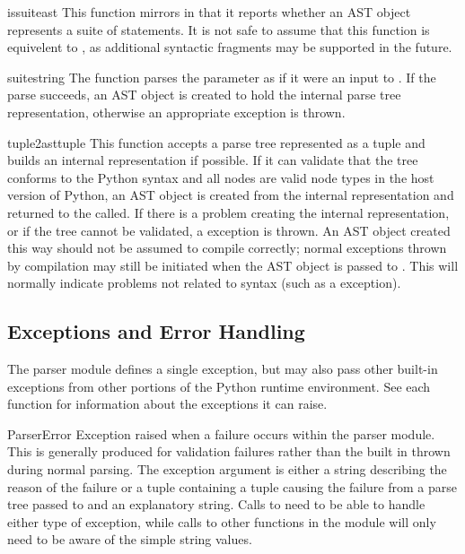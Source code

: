\begin{funcdesc}{issuite}{ast}
This function mirrors  in that it reports whether an
AST object represents a suite of statements.  It is not safe to assume
that this function is equivelent to , as
additional syntactic fragments may be supported in the future.
\end{funcdesc}


\begin{funcdesc}{suite}{string}
The  function parses the parameter 
as if it were an input to .  If
the parse succeeds, an AST object is created to hold the internal
parse tree representation, otherwise an appropriate exception is
thrown.
\end{funcdesc}


\begin{funcdesc}{tuple2ast}{tuple}
This function accepts a parse tree represented as a tuple and builds
an internal representation if possible.  If it can validate that the
tree conforms to the Python syntax and all nodes are valid node types
in the host version of Python, an AST object is created from the
internal representation and returned to the called.  If there is a
problem creating the internal representation, or if the tree cannot be
validated, a  exception is thrown.  An AST object
created this way should not be assumed to compile correctly; normal
exceptions thrown by compilation may still be initiated when the AST
object is passed to .  This will normally indicate
problems not related to syntax (such as a 
exception).
\end{funcdesc}



\subsection{Exceptions and Error Handling}

The parser module defines a single exception, but may also pass other
built-in exceptions from other portions of the Python runtime
environment.  See each function for information about the exceptions
it can raise.

\begin{excdesc}{ParserError}
Exception raised when a failure occurs within the parser module.  This
is generally produced for validation failures rather than the built in
 thrown during normal parsing.
The exception argument is either a string describing the reason of the
failure or a tuple containing a tuple causing the failure from a parse
tree passed to  and an explanatory string.  Calls to
 need to be able to handle either type of exception,
while calls to other functions in the module will only need to be
aware of the simple string values.
\end{excdesc}

